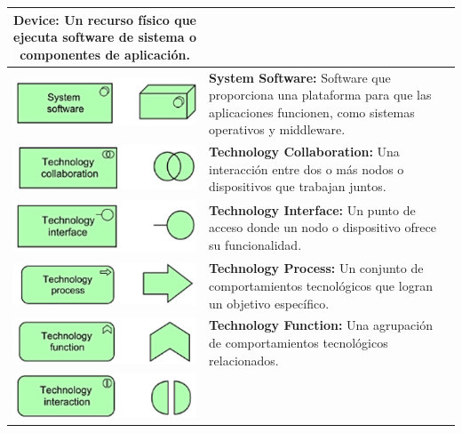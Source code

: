 \begin{longtable}{|c|p{8cm}|}
\textbf{Device:} Un recurso físico que ejecuta software de sistema o componentes de aplicación. \\
\hline
\includegraphics{apendices/ARCHI/technology/software.png} & 
\textbf{System Software:} Software que proporciona una plataforma para que las aplicaciones funcionen, como sistemas operativos y middleware. \\
\hline
\includegraphics{apendices/ARCHI/technology/collaboration.png} & 
\textbf{Technology Collaboration:} Una interacción entre dos o más nodos o dispositivos que trabajan juntos. \\
\hline
\includegraphics{apendices/ARCHI/technology/interface.png} & 
\textbf{Technology Interface:} Un punto de acceso donde un nodo o dispositivo ofrece su funcionalidad. \\
\hline
\includegraphics{apendices/ARCHI/technology/process.png} & 
\textbf{Technology Process:} Un conjunto de comportamientos tecnológicos que logran un objetivo específico. \\
\hline
\includegraphics{apendices/ARCHI/technology/function.png} & 
\textbf{Technology Function:} Una agrupación de comportamientos tecnológicos relacionados. \\
\hline
\includegraphics{apendices/ARCHI/technology/interaction.png} & 

\end{longtable}
